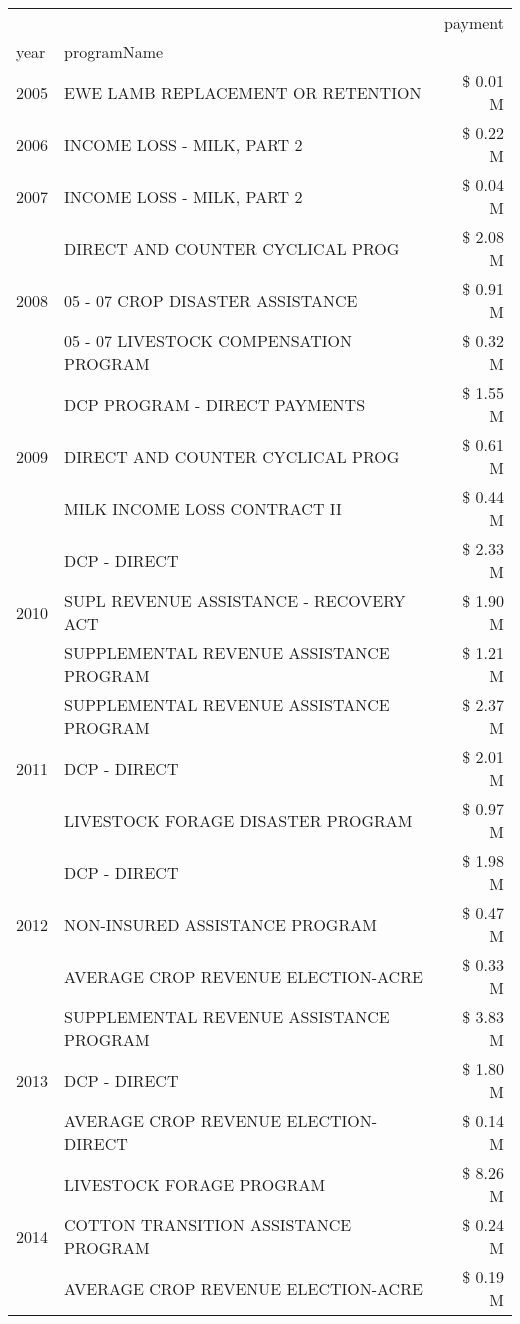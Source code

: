 \begin{tabular}{llr}
\toprule
 &  & payment \\
year & programName &  \\
\midrule
2005 & EWE LAMB REPLACEMENT OR RETENTION & \$ 0.01 M \\
\cline{1-3}
2006 & INCOME LOSS - MILK, PART 2 & \$ 0.22 M \\
\cline{1-3}
2007 & INCOME LOSS - MILK, PART 2 & \$ 0.04 M \\
\cline{1-3}
\multirow[t]{3}{*}{2008} & DIRECT AND COUNTER CYCLICAL PROG & \$ 2.08 M \\
 & 05 - 07 CROP DISASTER ASSISTANCE & \$ 0.91 M \\
 & 05 - 07 LIVESTOCK COMPENSATION PROGRAM & \$ 0.32 M \\
\cline{1-3}
\multirow[t]{3}{*}{2009} & DCP PROGRAM - DIRECT PAYMENTS & \$ 1.55 M \\
 & DIRECT AND COUNTER CYCLICAL PROG & \$ 0.61 M \\
 & MILK INCOME LOSS CONTRACT II & \$ 0.44 M \\
\cline{1-3}
\multirow[t]{3}{*}{2010} & DCP - DIRECT & \$ 2.33 M \\
 & SUPL REVENUE ASSISTANCE - RECOVERY ACT & \$ 1.90 M \\
 & SUPPLEMENTAL REVENUE ASSISTANCE PROGRAM & \$ 1.21 M \\
\cline{1-3}
\multirow[t]{3}{*}{2011} & SUPPLEMENTAL REVENUE ASSISTANCE PROGRAM & \$ 2.37 M \\
 & DCP - DIRECT & \$ 2.01 M \\
 & LIVESTOCK FORAGE DISASTER PROGRAM & \$ 0.97 M \\
\cline{1-3}
\multirow[t]{3}{*}{2012} & DCP - DIRECT & \$ 1.98 M \\
 & NON-INSURED ASSISTANCE PROGRAM & \$ 0.47 M \\
 & AVERAGE CROP REVENUE ELECTION-ACRE & \$ 0.33 M \\
\cline{1-3}
\multirow[t]{3}{*}{2013} & SUPPLEMENTAL REVENUE ASSISTANCE PROGRAM & \$ 3.83 M \\
 & DCP - DIRECT & \$ 1.80 M \\
 & AVERAGE CROP REVENUE ELECTION-DIRECT & \$ 0.14 M \\
\cline{1-3}
\multirow[t]{3}{*}{2014} & LIVESTOCK FORAGE PROGRAM & \$ 8.26 M \\
 & COTTON TRANSITION ASSISTANCE PROGRAM & \$ 0.24 M \\
 & AVERAGE CROP REVENUE ELECTION-ACRE & \$ 0.19 M \\

\end{tabular}
